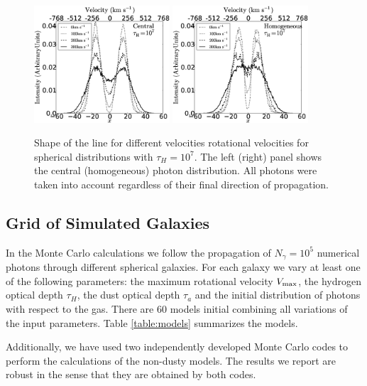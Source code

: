 \documentclass{emulateapj}
\newcommand{\ly}{{\ifmmode{{\rm Ly}\alpha~}\else{Ly$\alpha$~}\fi}}
\begin{document}
\begin{figure}
\begin{center}
  \includegraphics[width=0.45\textwidth]{f1_1.eps}
  \includegraphics[width=0.45\textwidth]{f1_2.eps}
\end{center}
\caption{Shape of the \ly line for
    different velocities rotational velocities for spherical
    distributions with $\tau_{H}=10^{7}$. The left (right) panel shows
    the central (homogeneous) photon distribution. All photons were
    taken into  account regardless of their final direction of propagation.
    \label{fig:differentvelocities}}  
\end{figure}


\subsection{Grid of Simulated Galaxies}
\label{sec:models}

In the Monte Carlo calculations we follow the propagation of $N_{\gamma}=10^5$
numerical photons through different spherical galaxies. For each galaxy
we vary at least one of the following parameters: the maximum
rotational velocity $V_{\rm max}$, the hydrogen optical depth $\tau_{H}$,
the dust optical depth $\tau_{a}$ and the initial distribution of photons
with respect to the gas. There are $60$ models initial combining all
variations of the input parameters. Table \ref{table:models}
summarizes the models.

Additionally, we have used two independently developed Monte Carlo
codes \citep{CLARA,DijkstraKramer} to perform the calculations of the
non-dusty models. The results we report are robust in the sense
that they are obtained by both codes. 
\end{document}
